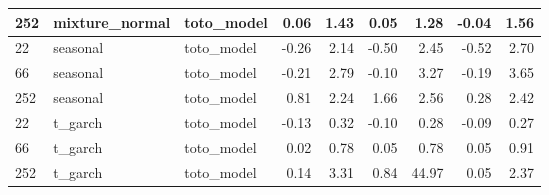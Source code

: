 {\begin{tabular}{lllrrrrrr}
252 & mixture\_normal & toto\_model & 0.06 & 1.43 & 0.05 & 1.28 & -0.04 & 1.56 \\
\midrule
22 & seasonal & toto\_model & -0.26 & 2.14 & -0.50 & 2.45 & -0.52 & 2.70 \\
66 & seasonal & toto\_model & -0.21 & 2.79 & -0.10 & 3.27 & -0.19 & 3.65 \\
252 & seasonal & toto\_model & 0.81 & 2.24 & 1.66 & 2.56 & 0.28 & 2.42 \\
\midrule
22 & t\_garch & toto\_model & -0.13 & 0.32 & -0.10 & 0.28 & -0.09 & 0.27 \\
66 & t\_garch & toto\_model & 0.02 & 0.78 & 0.05 & 0.78 & 0.05 & 0.91 \\
252 & t\_garch & toto\_model & 0.14 & 3.31 & 0.84 & 44.97 & 0.05 & 2.37 \\
\bottomrule
\end{tabular}
}